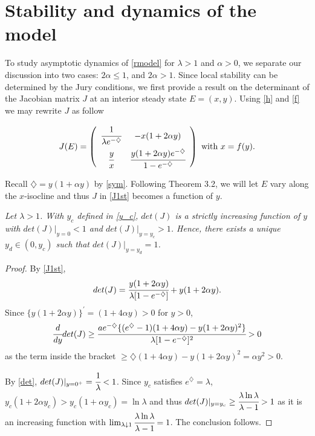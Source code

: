 \documentclass[11pt]{article}
\begin{document}
\section{Stability and dynamics of the model}
\setcounter{equation}{0} To study  asymptotic dynamics of
\eqref{rmodel} for $\lambda>1$ and $\alpha>0$, we  separate our
discussion into two cases: $2\alpha\leq 1$, and $2\alpha>1$. Since
local stability can be determined by the Jury conditions, we first
provide a result on the determinant of the Jacobian matrix $J$ at
an interior steady state $E=(x,y)$. Using \eqref{h} and \eqref{f}
we may rewrite $J$ as follow

\begin{equation}\label{J1st}
J(E) =\left(\begin{array} {cc} \cfrac{1}{\lambda e^{-\diamondsuit}} & -x(1+2\alpha y) \\[2ex]
 \cfrac{y}{x} &   \cfrac{y(1+2\alpha y)e^{-\diamondsuit}}{1-e^{-\diamondsuit}}
\end{array}
\right) \mbox{ with } x= f(y).
\end{equation}


Recall $\diamondsuit =y(1+ \alpha y)$ by \eqref{sym}. Following
Theorem 3.2, we will let $E$ vary along  the $x$-isocline and thus
$J $ in \eqref{J1st} becomes a function of $y$.

\medskip

 {\em Let $\lambda>1$. With $y_c$ defined in \eqref{y_c}, $det(J)$ is a
strictly increasing function of $y$ with  $det(J)|_{y=0} <1$ and $det(J)|_{y=y_c} >1$.
Hence, there exists a unique $y_d\in (0, y_c)$ such that  $det(J)|_{y=y_d} =1$.}

\begin{proof} By \eqref{J1st},
\begin{equation}\label{det}
det(J)= \cfrac{y(1+2\alpha y)}{\lambda[1-e^{-\diamondsuit}]}+
y(1+2\alpha y).
\end{equation}
Since $\{y(1+2\alpha y)\}^{\prime} =(1+4\alpha y)>0$ for $y>0$,
$$
\cfrac{d }{d y}det(J) \geq  \cfrac{ae^{-\diamondsuit} \{
(e^\diamondsuit-1)(1+4\alpha y)- y(1+2\alpha y)^2\}  }{\lambda
[1-e^{-\diamondsuit}]^2}  >0
$$
as the term inside the bracket  $ \geq  \diamondsuit(1+4\alpha y)-
y(1+2\alpha y)^2=\alpha y^2 >0$.

By \eqref{det}, $det(J)|_{y=0^+}=\cfrac{1}{\lambda}<1$. Since $y_c
$ satisfies $e^\diamondsuit=\lambda$, $y_c(1+2\alpha y_c)
>y_c(1+\alpha y_c) = \ln\lambda$ and thus $det(J)|_{y=y_c} \geq
\cfrac{\lambda \ln\lambda}{\lambda-1}>1$ as it is an increasing
function   with $\lim_{ \lambda \downarrow 1
}\cfrac{\lambda\ln\lambda}{\lambda-1}=1$. The conclusion
follows.\end{proof}
\end{document}
